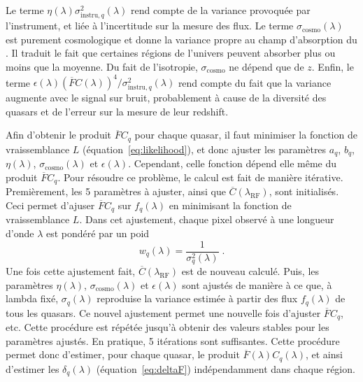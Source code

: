 \documentclass[11pt, twoside, a4paper, openright]{report}
\begin{document}
Le terme $\eta(\lambda)\sigma_{\mathrm{instru}, q}^2(\lambda)$ rend compte de la variance provoquée par l'instrument, et liée à l'incertitude sur la mesure des flux. Le terme $\sigma_{\mathrm{cosmo}}(\lambda)$ est purement cosmologique et donne la variance propre au champ d'absorption du \lya{}. Il traduit le fait que certaines régions de l'univers peuvent absorber plus ou moins que la moyenne. Du fait de l'isotropie, $\sigma_{\mathrm{cosmo}}$ ne dépend que de $z$. Enfin, le terme $\epsilon(\lambda)(\overline F C(\lambda))^4 / \sigma_{\mathrm{instru},q}^2 (\lambda)$ rend compte du fait que la variance augmente avec le signal sur bruit, probablement à cause de la diversité des quasars et de l'erreur sur la mesure de leur redshift.

Afin d'obtenir le produit $\overline F C_q$ pour chaque quasar, il faut minimiser la fonction de vraissemblance $L$ (équation~\ref{eq:likelihood}), et donc ajuster les paramètres $a_q$, $b_q$, $\eta(\lambda)$, $\sigma_{\mathrm{cosmo}}(\lambda)$ et $\epsilon(\lambda)$. Cependant, celle fonction dépend elle même du produit $\overline F C_q$. Pour résoudre ce problème, le calcul est fait de manière itérative.
Premièrement, les 5 paramètres à ajuster, ainsi que $\overline C(\lambda_{\mathrm{RF}})$, sont initialisés. Ceci permet d'ajuser $\overline F C_q$ sur $f_q(\lambda)$ en minimisant la fonction de vraissemblance $L$. Dans cet ajustement, chaque pixel observé à une longueur d'onde $\lambda$ est pondéré par un poid
\begin{equation}
  \label{eq:weights}
  w_{q}(\lambda) = \frac{1}{\sigma_{q}^2(\lambda)}  \; .
\end{equation}
Une fois cette ajustement fait, $\overline C(\lambda_{\mathrm{RF}})$ est de nouveau calculé. Puis, les paramètres $\eta(\lambda)$, $\sigma_{\mathrm{cosmo}}(\lambda)$ et $\epsilon(\lambda)$ sont ajustés de manière à ce que, à lambda fixé, $\sigma_q(\lambda)$ reproduise la variance estimée à partir des flux $f_q(\lambda)$ de tous les quasars. Ce nouvel ajustement permet une nouvelle fois d'ajuster $\overline F C_q$, etc. Cette procédure est répétée jusqu'à obtenir des valeurs stables pour les paramètres ajustés. En pratique, 5 itérations sont suffisantes. Cette procédure permet donc d'estimer, pour chaque quasar, le produit $\overline F(\lambda) C_q(\lambda)$, et ainsi d'estimer les $\delta_q(\lambda)$ (équation~\ref{eq:deltaF}) indépendamment dans chaque région.
\end{document}
